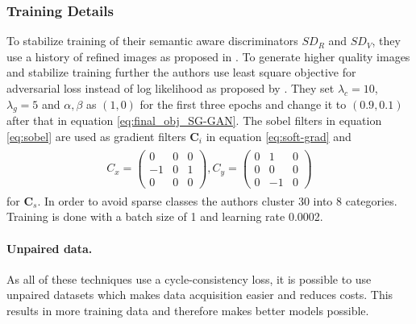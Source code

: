 \subsubsection{Training Details}
To stabilize training of their semantic aware discriminators $SD_R$ and $SD_V$, they use a history of refined images as proposed in \cite{DBLP:journals/corr/ShrivastavaPTSW16}. To generate higher quality images and stabilize training further the authors use least square objective for adversarial loss instead of log likelihood as proposed by \cite{DBLP:journals/corr/MaoLXLW16}. They set $\lambda_c = 10$, $\lambda_g = 5$ and $\alpha, \beta$ as $(1,0)$ for the first three epochs and change it to $(0.9, 0.1)$ after that in equation \ref{eq:final_obj_SG-GAN}. The sobel filters in equation \ref{eq:sobel} are used as gradient filters $\mathbf{C}_i$ in equation \ref{eq:soft-grad} and 
\begin{align}
		\begin{array}{cc}
		C_x = 
		\begin{pmatrix}
			0 & 0 & 0\\
			-1 & 0 & 1\\
			0 & 0 & 0
		\end{pmatrix},
		C_y = 
		\begin{pmatrix}
			0 & 1 & 0\\
			0 & 0 & 0\\
			0 & -1 & 0
		\end{pmatrix}
	\end{array}
\end{align}
for $\mathbf{C}_s$. In order to avoid sparse classes the authors cluster 30 \cite{Cordts_2016_CVPR} into 8 categories. Training is done with a batch size of 1 and learning rate 0.0002. 


\paragraph{Unpaired data.} As all of these techniques use a cycle-consistency loss, it is possible to use unpaired datasets which makes data acquisition easier and reduces costs. This results in more training data and therefore makes better models possible. 
